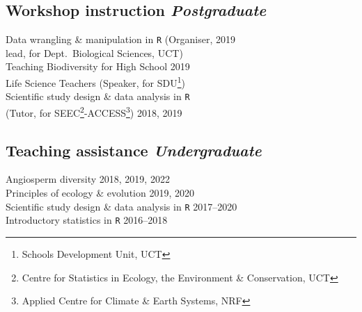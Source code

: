 \documentclass[10pt]{article}
\begin{document}
\begin{multicols}{2} %

\subsection*{Workshop instruction %
                                 \hfill {\small \textmd{\textit{Postgraduate}}}}

Data wrangling \& manipulation in \texttt{R}
  {\small (Organiser,}                             \hfill {\small       2019} \\
  \hspace{2em} {\small lead, for Dept.~Biological
    Sciences, UCT)}                                                           \\
Teaching Biodiversity for High School              \hfill {\small       2019} \\
  \hspace{2em} Life Science Teachers {\small
    (Speaker, for SDU\footnote{Schools Development
    Unit, UCT})}                                                              \\
Scientific study design \& data analysis in \texttt{R}                        \\
  \hspace{2em} {\small(Tutor, for SEEC\footnote{
    Centre for Statistics in Ecology, the
    Environment \& Conservation, UCT}-ACCESS\footnote{
      Applied Centre for Climate \& Earth Systems,
      NRF})}                                       \hfill {\small 2018, 2019}

\subsection*{Teaching assistance %
                                \hfill {\small \textmd{\textit{Undergraduate}}}}

Angiosperm diversity                         \hfill {\small 2018, 2019, 2022} \\
Principles of ecology \& evolution           \hfill {\small       2019, 2020} \\
Scientific study design \& data analysis in \texttt{R}
                                             \hfill {\small       2017--2020} \\
Introductory statistics in \texttt{R}        \hfill {\small       2016--2018}


\end{multicols}
\end{document}
